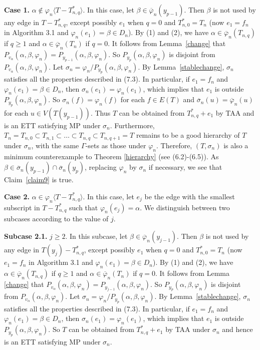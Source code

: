 \documentclass[11pt]{article}
\newcommand{\phibar}{\overline{\varphi}}
\begin{document}
{\bf Case 1.} $\alpha\notin \varphi_n \langle T -  T_{n,q}^* \rangle$. In this case, let $\beta\in\overline{\varphi}_n(y_{p-1})$.
Then $\beta$ is not used by any edge in $T -  T_{n,q}^*$, except possibly $e_1$ when $q=0$ and $T_{n,0}^*=T_n$ (now $e_1=f_n$
in Algorithm 3.1 and $\varphi_n(e_1)=\beta \in D_n$). By (1) and (2), we have $\alpha\in\phibar_n(T_{n,q})$ if $q \ge 1$ and $\alpha\in\phibar_n(T_n)$ if $q=0$. It follows from Lemma~\ref{change} that $P_{v_{\alpha}}(\alpha,\beta,\varphi_n)=P_{y_{p-1}}(\alpha,\beta,\varphi_n)$. So $P_{y_{p}}(\alpha,\beta,\varphi_n)$ is disjoint from $P_{v_{\alpha}}(\alpha,\beta,\varphi_n)$.  Let $\sigma_n = \varphi_n/P_{y_{p}}(\alpha,\beta,\varphi_n)$. By Lemma~\ref{stablechange},  $\sigma_n$ satisfies all the properties described in (7.3). In particular, if $e_1=f_n$ and $\varphi_n(e_1)=\beta \in D_n$,
then $\sigma_n(e_1)=\varphi_n(e_1)$, which implies that $e_1$ is outside $P_{y_{p}}(\alpha,\beta,\varphi_n)$.
So $\sigma_n(f)=\varphi_n(f)$ for each $f\in E(T)$ and $\overline{\sigma}_n(u)=\phibar_n(u)$ for each $u\in V(T(y_{p-1}))$. 
Thus $T$ can be obtained from $T_{n,q}^*+e_1$ by TAA and is an ETT satisfying MP under $\sigma_n$. Furthermore, $T_n=T_{n,0} \subset T_{n,1} 
\subset \ldots \subset T_{n,q} \subset T_{n,q+1}=T$ remains to be a good hierarchy of $T$ under $\sigma_n$, with the same $\Gamma$-sets as those under $\varphi_n$. Therefore, $(T, \sigma_n)$ is also a minimum counterexample to Theorem \ref{hierarchy} 
(see (6.2)-(6.5)). As $\beta\in \overline{\sigma}_n(y_{p-1}) \cap \overline{\sigma}_n(y_p)$, replacing $\varphi_n$ by 
$\sigma_n$ if necessary, we see that Claim~\ref{claim9} is true.

{\bf Case 2.} $\alpha\in \varphi_n \langle T -  T_{n,q}^* \rangle$. In this case, let $e_j$ be the edge with the smallest
subscript in $T -T_{n,q}^*$ such that $\varphi_n(e_j)=\alpha$. We distinguish between two subcases according to the value of 
$j$.

{\bf Subcase 2.1.} $j\geq 2$. In this subcase, let $\beta \in \overline{\varphi}_n(y_{j-1})$. Then $\beta$ is not used 
by any edge in $T(y_j) -  T_{n,q}^*$, except possibly $e_1$ when $q=0$ and $T_{n,0}^*=T_n$ (now $e_1=f_n$ in Algorithm 3.1 
and $\varphi_n(e_1)=\beta \in D_n$). By (1) and (2), we have $\alpha\in\phibar_n(T_{n,q})$ if $q \ge 1$ and $\alpha\in\phibar_n(T_n)$ 
if $q=0$. It follows from Lemma \ref{change} that  $P_{v_{\alpha}}(\alpha,\beta,\varphi_n)=P_{y_{j-1}}(\alpha,\beta,\varphi_n)$. 
So $P_{y_{p}}(\alpha,\beta,\varphi_n)$ is disjoint from $P_{v_{\alpha}}(\alpha,\beta,\varphi_n)$. Let $\sigma_n = \varphi_n/P_{y_{p}}(\alpha,\beta,\varphi_n)$. By Lemma~\ref{stablechange}, $\sigma_n$ satisfies all the properties 
described in (7.3). In particular, if $e_1=f_n$ and $\varphi_n(e_1)=\beta \in D_n$, then $\sigma_n(e_1)=\varphi_n(e_1)$, 
which implies that $e_1$ is outside $P_{y_{p}}(\alpha,\beta,\varphi_n)$. So $T$ can be obtained from $T_{n,q}^*+e_1$ by TAA 
under $\sigma_n$ and hence is an ETT satisfying MP under $\sigma_n$. 
\end{document}
